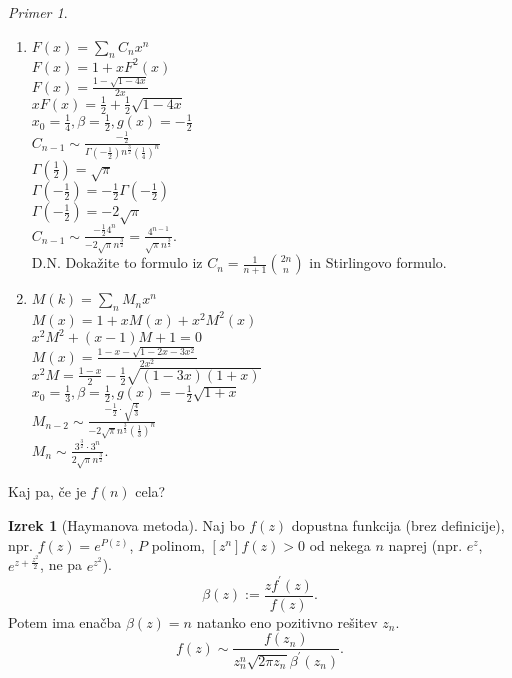 \documentclass[a4paper, 12pt]{book}
\theoremstyle{definition}
\newtheorem{theorem}[counter]{Izrek}
\theoremstyle{remark}
\newtheorem*{ex}{Primer}
\begin{document}
\begin{ex} \text{}
  \begin{enumerate}[label=(\arabic*)]
    \item $F(x) = \sum_n C_n x^n$ \\
      $F(x) = 1 + x F^2(x)$ \\
      $F(x) = \frac{1 - \sqrt{1 - 4x}}{2x}$ \\
      $x F(x) = \frac{1}{2} + \frac{1}{2} \sqrt{1-4x}$ \\
      $x_0 = \frac{1}{4}, \beta = \frac{1}{2}, g(x) = -\frac{1}{2}$ \\
      $C_{n-1} \sim \frac{-\frac{1}{2}}{\Gamma\left(-\frac{1}{2}\right)
      n^{\frac{3}{2}} \left(\frac{1}{4}\right)^n}$ \\
      $\Gamma\left(\frac{1}{2}\right) = \sqrt{\pi}$ \\
      $\Gamma\left(-\frac{1}{2}\right) = -\frac{1}{2} \Gamma\left(-\frac{1}{2}\right)$ \\
      $\Gamma\left(-\frac{1}{2}\right) = - 2 \sqrt{\pi}$ \\
      $C_{n-1} \sim \frac{-\frac{1}{2} 4^n}{-2 \sqrt{\pi} n^{\frac{3}{2}}}
      = \frac{4^{n-1}}{\sqrt{\pi} n^{\frac{3}{2}}}$. \\
      D.N. Dokažite to formulo iz $C_n = \frac{1}{n+1} \binom{2n}{n}$ in Stirlingovo formulo.
    \item $M(k) = \sum_n M_n x^n$ \\
      $M(x) = 1 + x M(x) + x^2 M^2(x)$ \\
      $x^2 M^2 + (x-1) M + 1 = 0$ \\
      $M(x) = \frac{1 - x - \sqrt{1 - 2x - 3x^2}}{2x^2}$ \\
      $x^2 M = \frac{1-x}{2} - \frac{1}{2} \sqrt{(1-3x)(1+x)}$ \\
      $x_0 = \frac{1}{3}, \beta = \frac{1}{2}, g(x) = -\frac{1}{2} \sqrt{1 + x}$ \\
      $M_{n-2} \sim \frac{-\frac{1}{2} \cdot
      \sqrt{\frac{4}{3}}}{-2 \sqrt{\pi} n^{\frac{3}{2}} \left(\frac{1}{3}\right)^n}$ \\
      $M_n \sim \frac{3^{\frac{3}{2}} \cdot 3^n}{2 \sqrt{\pi} n^{\frac{3}{2}}}$.
  \end{enumerate}
\end{ex}
Kaj pa, če je $f(n)$ cela?
\begin{theorem}[Haymanova metoda]
  Naj bo $f(z)$ dopustna funkcija (brez definicije), npr. $f(z) = e^{P(z)}$, $P$ polinom,
  $[z^n] f(z) > 0$ od nekega $n$ naprej (npr. $e^z$, $e^{z + \frac{z^2}{2}}$, ne pa $e^{z^2}$). \\
  \begin{equation*}
    \beta(z) := \frac{z f^{'}(z)}{f(z)}.
  \end{equation*}
  Potem ima enačba $\beta(z) = n$ natanko eno pozitivno rešitev $z_n$. \\
  \begin{equation*}
    [z^n] f(z) \sim \frac{f(z_n)}{z_n^n \sqrt{2 \pi z_n} \beta^{'}(z_n)}.
  \end{equation*}
\end{theorem}
\end{document}
